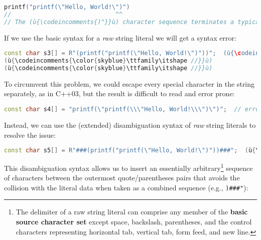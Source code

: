 \begin{lstlisting}[language=C++]
printf("printf(\"Hello, World!\")")
//                             ^^
// The (ù{\codeincomments{)"}}ù) character sequence terminates a typical raw string literal.
\end{lstlisting}

\noindent If we use the basic syntax for a \emph{raw} string literal we will get a
syntax error:

\begin{lstlisting}[language=C++,]
const char s3[] = R"(printf("printf(\"Hello, World!\")"))";  (ù{\codeincomments{\color{skyblue}\ttfamily\itshape // collision}}ù)
(ù{\codeincomments{\color{skyblue}\ttfamily\itshape //}}ù)                                                    (ù{\codeincomments{\color{skyblue}\ttfamily\itshape\textasciicircum\textasciicircum}}ù)
(ù{\codeincomments{\color{skyblue}\ttfamily\itshape //}}ù)                       (ù{\codeincomments{\color{skyblue}\ttfamily\itshape Syntax error after literal ends}}ù)
\end{lstlisting}

\noindent To circumvent this problem, we could escape every special character in
the string separately, as in C++03, but the result is difficult to read
and error prone:

\begin{lstlisting}[language=C++]
const char s4[] = "printf(\"printf(\\\"Hello, World!\\\")\")";  // error prone
\end{lstlisting}

\noindent Instead, we can use the (extended) disambiguation syntax of \emph{raw}
string literals to resolve the issue:

\begin{lstlisting}[language=C++]
const char s5[] = R"###(printf("printf(\"Hello, World!\")"))###";  (ù{\codeincomments{\color{skyblue}\ttfamily\itshape // cleaner}}ù)
\end{lstlisting}

\noindent This disambiguation syntax allows us to insert an essentially
arbitrary{\cprotect\footnote{The delimiter of a raw string literal can
comprise any member of the \textbf{basic source character set} except
space, backslash, parentheses, and the control characters representing
  horizontal tab, vertical tab, form feed, and new line.}} sequence of
characters between the outermost quote/parentheses pairs that avoids the
collision with the literal data when taken as a combined sequence (e.g.,
\texttt{)\#\#\#"}):

